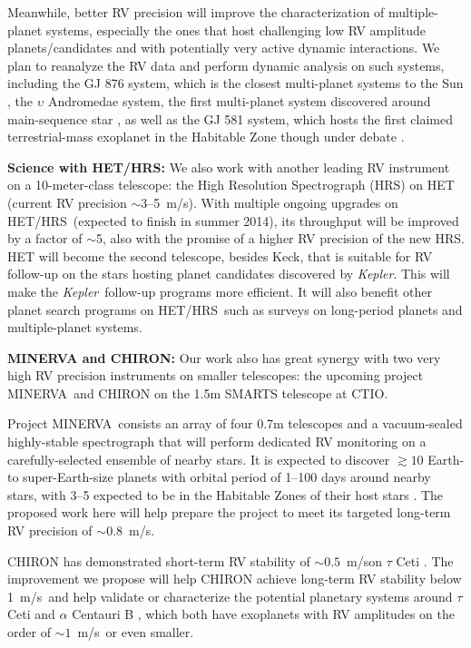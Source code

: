 \documentclass[12pt]{article}
\def\mps{m/s}
\def\kepler{{\it Kepler}}
\def\minerva{MINERVA}
\def\hrs{HET/HRS}
\begin{document}
Meanwhile, better RV precision will improve the characterization of
multiple-planet systems, especially the ones that host challenging low
RV amplitude planets/candidates and with potentially very active
dynamic interactions. We plan to reanalyze the RV data and perform
dynamic analysis on such systems, including the GJ 876 system, which
is the closest multi-planet systems to the Sun
\citep{marcy2001,rivera2005,rivera2010}, the $\upsilon$ Andromedae
system, the first multi-planet system discovered around main-sequence
star \citep{butler1999,wright2009,curiel2011}, as well as the GJ 581
system, which hosts the first claimed terrestrial-mass exoplanet in
the Habitable Zone \citep{vogt2010} though under debate
\citep[e.g.,][]{gregory2011,vogt2012,robertson2013}.

\textbf{Science with \hrs: } We also work with another leading RV
instrument on a 10-meter-class telescope: the High Resolution
Spectrograph (HRS) on HET (current RV precision $\sim$3--5~\mps). With
multiple ongoing upgrades on \hrs\ (expected to finish in summer
2014), its throughput will be improved by a factor of $\sim$5, also
with the promise of a higher RV precision of the new HRS. HET will
become the second telescope, besides Keck, that is suitable for RV
follow-up on the stars hosting planet candidates discovered by
\kepler. This will make the \kepler\ follow-up programs more
efficient. It will also benefit other planet search programs on
\hrs\ such as surveys on long-period planets and multiple-planet
systems.

\textbf{MINERVA and CHIRON: } Our work also has great synergy with two
very high RV precision instruments on smaller telescopes: the upcoming
project \minerva\ and CHIRON on
the 1.5m SMARTS telescope at CTIO. 

Project \minerva\ consists an array of four 0.7m telescopes and a
vacuum-sealed highly-stable spectrograph that will perform dedicated
RV monitoring on a carefully-selected ensemble of nearby stars. It is
expected to discover $\gtrsim 10$ Earth- to super-Earth-size planets
with orbital period of 1--100 days around nearby stars, with 3--5
expected to be in the Habitable Zones of their host stars
\citep{bottom2013,hogstrom2013}. The proposed work here will help
prepare the project to meet its targeted long-term RV precision of
$\sim 0.8$~\mps.

CHIRON has demonstrated short-term RV stability of $\sim0.5$~\mps on
$\tau$ Ceti \citep{chiron2013}. The improvement we propose will help
CHIRON achieve long-term RV stability below 1~\mps\ and help validate
or characterize the potential planetary systems around $\tau$ Ceti
\citep{tuomi2013} and $\alpha$ Centauri B
\citep{dumusque2012,hatzes2013}, which both have exoplanets with RV
amplitudes on the order of $\sim 1$~\mps\ or even smaller.
\end{document}

